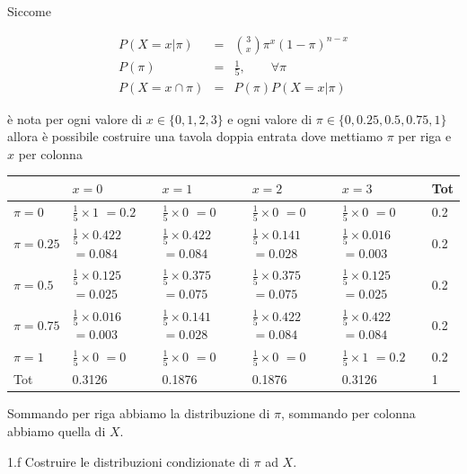 \documentclass[
  11pt,
]{book}
\theoremstyle{mytheoremstyle}
\theoremstyle{mydefstyle}
\newenvironment{sol}
  {
  \begin{tcolorbox}[enhanced,breakable,arc=0.1mm,boxrule=1pt,colback=white,colframe=iblue,
  title=\bf \fontfamily{lmss}\selectfont \hspace{.5 cm} Soluzione,drop fuzzy shadow]

}{
\end{tcolorbox}
  }
\begin{document}
\begin{sol}
Siccome

\begin{eqnarray*}
  P(X=x|\pi) &=&  \binom{3}{x}\pi^x(1-\pi)^{n-x}\\
  P(\pi)      &=& \frac 15,\qquad \forall \pi\\
  P(X=x\cap\pi) &=& P(\pi)P(X=x|\pi)
\end{eqnarray*}

è nota per ogni valore di \(x\in\{0,1,2,3\}\) e ogni valore di \(\pi\in\{0,0.25,0.5,0.75,1\}\) allora è possibile costruire una
tavola doppia entrata dove mettiamo \(\pi\) per riga e \(x\) per colonna

\begin{tabular}{llllll}
\toprule
  & $x=0$ & $x=1$ & $x=2$ & $x=3$ & Tot\\
\midrule
$\pi=0$ & $\frac 15\times1$ $=0.2$ & $\frac 15\times0$ $=0$ & $\frac 15\times0$ $=0$ & $\frac 15\times0$ $=0$ & 0.2\\
$\pi=0.25$ & $\frac 15\times0.422$ $=0.084$ & $\frac 15\times0.422$ $=0.084$ & $\frac 15\times0.141$ $=0.028$ & $\frac 15\times0.016$ $=0.003$ & 0.2\\
$\pi=0.5$ & $\frac 15\times0.125$ $=0.025$ & $\frac 15\times0.375$ $=0.075$ & $\frac 15\times0.375$ $=0.075$ & $\frac 15\times0.125$ $=0.025$ & 0.2\\
$\pi=0.75$ & $\frac 15\times0.016$ $=0.003$ & $\frac 15\times0.141$ $=0.028$ & $\frac 15\times0.422$ $=0.084$ & $\frac 15\times0.422$ $=0.084$ & 0.2\\
$\pi=1$ & $\frac 15\times0$ $=0$ & $\frac 15\times0$ $=0$ & $\frac 15\times0$ $=0$ & $\frac 15\times1$ $=0.2$ & 0.2\\
Tot & 0.3126 & 0.1876 & 0.1876 & 0.3126 & 1\\
\bottomrule
\end{tabular}

Sommando per riga abbiamo la distribuzione di \(\pi\), sommando per colonna abbiamo
quella di \(X\).

\end{sol}

1.f Costruire le distribuzioni condizionate di \(\pi\) ad \(X\).
\end{document}
